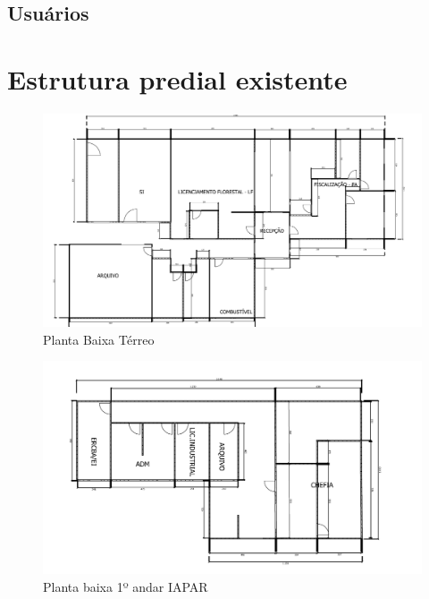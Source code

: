 \documentclass[	DIV=calc,%
							paper=a4,%
							fontsize=12pt,%
							onecolumn]{scrartcl}	 					%
\begin{document}
\subsection{Usuários}



\section{Estrutura predial existente}


\begin{figure}[h!]
	\centering
	\includegraphics[width=\textwidth]{figura1.png}
	\caption[Planta Baixa Térreo]{Planta Baixa Térreo}
	\label{fig:figura1}
\end{figure}

\begin{figure}[h!]
	\centering
	\includegraphics[width=\textwidth]{figura2.png}
	\caption[Planta baixa 1º andar IAPAR]{Planta baixa 1º andar IAPAR}
	\label{fig:figura2}
\end{figure}
\end{document}
